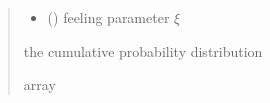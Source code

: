 \documentclass[letterpaper,10pt,english]{sphinxmanual}
\begin{document}
\begin{fulllineitems}
\begin{quote}
\begin{description}
\begin{itemize}
\item {} 
\sphinxAtStartPar
{} () \textendash{} feeling parameter \(\xi\)

\end{itemize}

\sphinxAtStartPar
the cumulative probability distribution

\sphinxAtStartPar
array

\end{description}\end{quote}

\end{fulllineitems}

\end{document}
